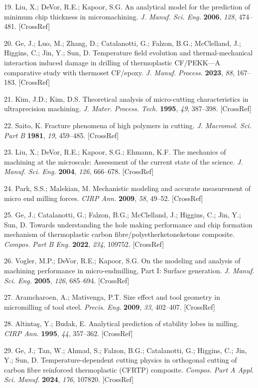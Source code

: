 \documentclass{article}
\begin{document}
\begin{hangpars}
19. Liu, X.; DeVor, R.E.; Kapoor, S.G. An analytical model for the prediction of minimum chip thickness in micromachining. \emph{J. Manuf. Sci. Eng.} \textbf{2006}, \emph{128}, 474–481. [CrossRef]

20. Ge, J.; Luo, M.; Zhang, D.; Catalanotti, G.; Falzon, B.G.; McClelland, J.; Higgins, C.; Jin, Y.; Sun, D. Temperature field evolution and thermal-mechanical interaction induced damage in drilling of thermoplastic CF/PEKK—A comparative study with thermoset CF/epoxy. \emph{J. Manuf. Process.} \textbf{2023}, \emph{88}, 167–183. [CrossRef]

21. Kim, J.D.; Kim, D.S. Theoretical analysis of micro-cutting characteristics in ultraprecision machining. \emph{J. Mater. Process. Tech.} \textbf{1995}, \emph{49}, 387–398. [CrossRef]

22. Saito, K. Fracture phenomena of high polymers in cutting. \emph{J. Macromol. Sci. Part B} \textbf{1981}, \emph{19}, 459–485. [CrossRef]

23. Liu, X.; DeVor, R.E.; Kapoor, S.G.; Ehmann, K.F. The mechanics of machining at the microscale: Assessment of the current state of the science. \emph{J. Manuf. Sci. Eng.} \textbf{2004}, \emph{126}, 666–678. [CrossRef]

24. Park, S.S.; Malekian, M. Mechanistic modeling and accurate measurement of micro end milling forces. \emph{CIRP Ann.} \textbf{2009}, \emph{58}, 49–52. [CrossRef]

25. Ge, J.; Catalanotti, G.; Falzon, B.G.; McClelland, J.; Higgins, C.; Jin, Y.; Sun, D. Towards understanding the hole making performance and chip formation mechanism of thermoplastic carbon fibre/polyetherketoneketone composite. \emph{Compos. Part B Eng.} \textbf{2022}, \emph{234}, 109752. [CrossRef]

26. Vogler, M.P.; DeVor, R.E.; Kapoor, S.G. On the modeling and analysis of machining performance in micro-endmilling, Part I: Surface generation. \emph{J. Manuf. Sci. Eng.} \textbf{2005}, \emph{126}, 685–694. [CrossRef]

27. Aramcharoen, A.; Mativenga, P.T. Size effect and tool geometry in micromilling of tool steel. \emph{Precis. Eng.} \textbf{2009}, \emph{33}, 402–407. [CrossRef]

28. Altintaş, Y.; Budak, E. Analytical prediction of stability lobes in milling. \emph{CIRP Ann.} \textbf{1995}, \emph{44}, 357–362. [CrossRef]

29. Ge, J.; Tan, W.; Ahmad, S.; Falzon, B.G.; Catalanotti, G.; Higgins, C.; Jin, Y.; Sun, D. Temperature-dependent cutting physics in orthogonal cutting of carbon fibre reinforced thermoplastic (CFRTP) composite. \emph{Compos. Part A Appl. Sci. Manuf.} \textbf{2024}, \emph{176}, 107820. [CrossRef]


\end{hangpars}
\end{document}
